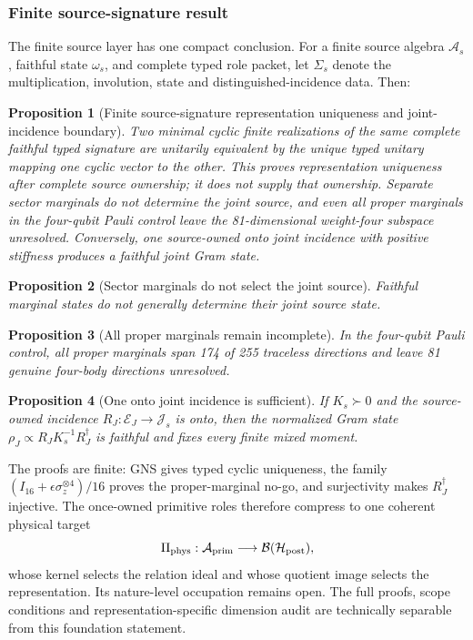 \documentclass[11pt]{article}
\newtheorem{proposition}{Proposition}
\begin{document}
\subsubsection{Finite source-signature result}

The finite source layer has one compact conclusion.  For a finite source
algebra \(\mathcal A_s\), faithful state \(\omega_s\), and complete typed role
packet, let \(\Sigma_s\) denote the multiplication, involution, state and
distinguished-incidence data.  Then:
\begin{proposition}[Finite source-signature representation uniqueness and joint-incidence boundary]
\label{prop:finite-source-signature-uniqueness}
Two minimal cyclic finite realizations of the same complete faithful typed
signature are unitarily equivalent by the unique typed unitary mapping one
cyclic vector to the other.  This proves representation uniqueness after
complete source ownership; it does not supply that ownership.  Separate
sector marginals do not determine the joint source, and even all proper
marginals in the four-qubit Pauli control leave the 81-dimensional weight-four
subspace unresolved.  Conversely, one source-owned onto joint incidence with
positive stiffness produces a faithful joint Gram state.
\end{proposition}
\begin{proposition}[Sector marginals do not select the joint source]
\label{prop:marginal-joint-nogo}
Faithful marginal states do not generally determine their joint source state.
\end{proposition}
\begin{proposition}[All proper marginals remain incomplete]
\label{prop:proper-marginal-nogo}
In the four-qubit Pauli control, all proper marginals span 174 of 255 traceless
directions and leave 81 genuine four-body directions unresolved.
\end{proposition}
\begin{proposition}[One onto joint incidence is sufficient]
\label{prop:onto-joint-incidence}
If \(K_s\succ0\) and the source-owned incidence
\(R_J:\mathcal E_J\to\mathcal J_s\) is onto, then the normalized Gram state
\(\rho_J\propto R_JK_s^{-1}R_J^\dagger\) is faithful and fixes every finite
mixed moment.
\end{proposition}
The proofs are finite: GNS gives typed cyclic uniqueness, the family
\((I_{16}+\epsilon\sigma_z^{\otimes4})/16\) proves the proper-marginal no-go,
and surjectivity makes \(R_J^\dagger\) injective.  The once-owned primitive
roles therefore compress to one coherent physical target
\begin{equation}
 \Pi_{\rm phys}:\mathcal A_{\rm prim}
 \longrightarrow\mathcal B(\mathcal H_{\rm post}),
 \label{eq:physical-source-homomorphism}
\end{equation}
whose kernel selects the relation ideal and whose quotient image selects the
representation.  Its nature-level occupation remains open.  The full proofs,
scope conditions and representation-specific dimension audit are technically
separable from this foundation statement.
\end{document}
